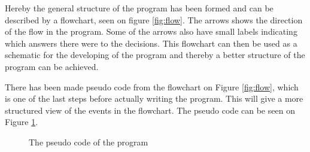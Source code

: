 
Hereby the general structure of the program has been formed and can be described by a flowchart, seen on figure \ref{fig:flow}.
The arrows shows the direction of the flow in the program. Some of the arrows also have small labels indicating which answers there were to the decisions.
This flowchart can then be used as a schematic for the developing of the program and thereby a better structure of the program can be achieved.

There has been made pseudo code from the flowchart on Figure \ref{fig:flow}, which is one of the last steps before actually writing the program. This will give a more structured view of the events in the flowchart. The pseudo code can be seen on Figure \ref{fig:pseudocode}.

\begin{figure}[H] \centering
			
\caption{The pseudo code of the program}\label{fig:pseudocode}
\end{figure} 